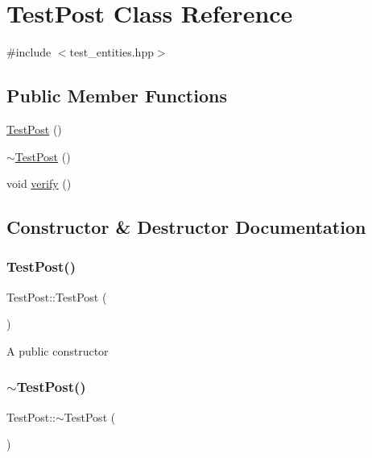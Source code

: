 \hypertarget{class_test_post}{}\section{Test\+Post Class Reference}
\label{class_test_post}


{\ttfamily \#include $<$test\+\_\+entities.\+hpp$>$}

\subsection*{Public Member Functions}
\begin{DoxyCompactItemize}
\item 
\hyperlink{class_test_post_a6dc370335c037f5768b98c8dc8addd22}{Test\+Post} ()
\item 
\hyperlink{class_test_post_a082f87fdb7c565b5c670be7f40ea516b}{$\sim$\+Test\+Post} ()
\item 
void \hyperlink{class_test_post_a8e4d52190e6be295d251dfc348591b92}{verify} ()
\end{DoxyCompactItemize}


\subsection{Constructor \& Destructor Documentation}
\mbox{\label{class_test_post_a6dc370335c037f5768b98c8dc8addd22}} 
\subsubsection{\texorpdfstring{Test\+Post()}{TestPost()}}
{\footnotesize\ttfamily Test\+Post\+::\+Test\+Post (\begin{DoxyParamCaption}{ }\end{DoxyParamCaption})}

A public constructor \mbox{\label{class_test_post_a082f87fdb7c565b5c670be7f40ea516b}} 
\subsubsection{\texorpdfstring{$\sim$\+Test\+Post()}{~TestPost()}}
{\footnotesize\ttfamily Test\+Post\+::$\sim$\+Test\+Post (\begin{DoxyParamCaption}{ }\end{DoxyParamCaption})}

